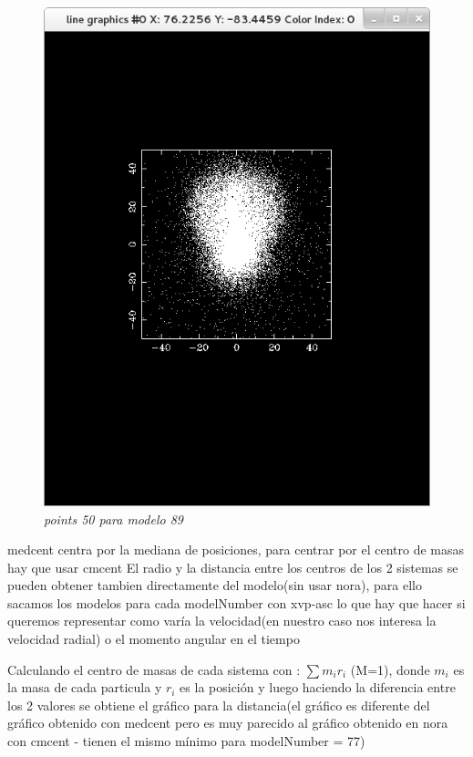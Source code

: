 \documentclass[12pt]{book}
\begin{document}
\begin{itemize}
\begin{figure}[!h]
 \centering
 \includegraphics[scale=0.5]{imgConModel89Points50.png}
 \caption{\emph{points 50 para modelo 89}}
 \label{Fig: 5}
\end{figure}

medcent centra por la mediana de posiciones, para centrar por el centro de masas hay que usar cmcent
El radio y la distancia entre los centros de los 2 sistemas se pueden obtener tambien directamente del modelo(sin usar nora), para ello sacamos los modelos para cada modelNumber con xvp-asc lo que hay que hacer si queremos representar como varía la velocidad(en nuestro caso nos interesa la velocidad radial) o el momento angular en el tiempo

Calculando el centro de masas de cada sistema con :
$\sum{m_ir_i}$ (M=1), donde $m_i$ es la masa de cada particula y $r_i$ es la posición 
y luego haciendo la diferencia entre los 2 valores se obtiene el gráfico para la distancia(el gráfico es diferente del gráfico obtenido con medcent pero es muy parecido al gráfico obtenido en nora con cmcent - tienen el mismo mínimo para modelNumber = 77)


\end{itemize}
\end{document}
